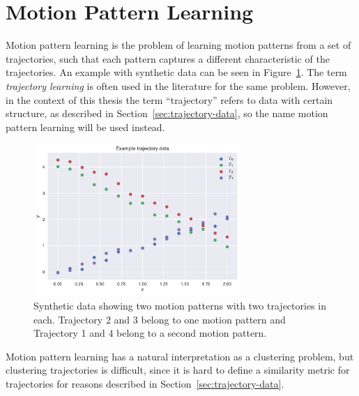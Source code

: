 \section{Motion Pattern Learning}
Motion pattern learning is the problem of learning motion patterns from a
set of trajectories, such that each pattern captures a different
characteristic of the trajectories. An example with synthetic data can be
seen in Figure~\ref{fig:motion-pattern-example}. The term
\textit{trajectory learning} is often used in the literature for the
same problem. However, in the
context of this thesis the term ``trajectory'' refers to data with
certain structure, as described in Section~\ref{sec:trajectory-data}, so 
the name motion pattern learning will be used instead.
\begin{figure}[H]
  \centering
  \includegraphics[width=0.7\textwidth]{figures/motion-pattern-example}
  \caption{Synthetic data showing two motion patterns with two trajectories in
    each. Trajectory 2 and 3 belong to one motion pattern and
    Trajectory 1 and 4 belong to a second motion pattern.}\label{fig:motion-pattern-example}
\end{figure}
Motion pattern learning has a natural interpretation as a
clustering problem, but clustering trajectories is difficult,
since it is hard to define a similarity metric for trajectories for
reasons described in Section~\ref{sec:trajectory-data}.

